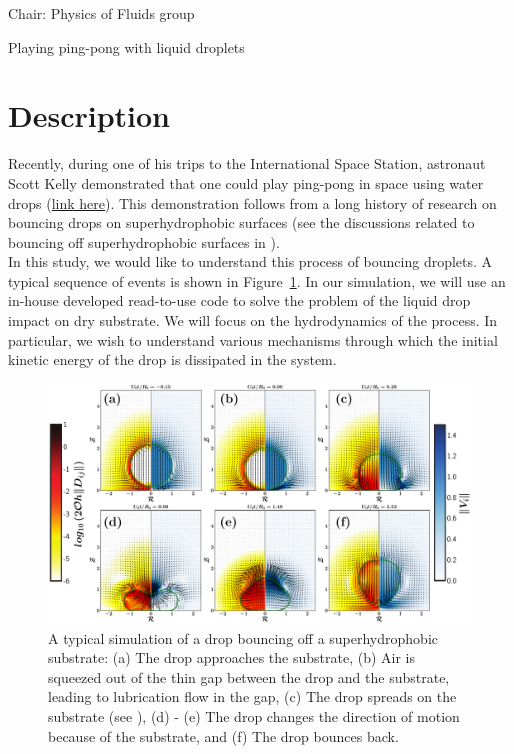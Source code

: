 \documentclass[a4paper,10pt]{article}
\begin{document}
\noindent Chair: Physics of Fluids group
\begin{center}
 \begin{LARGE}
  Playing ping-pong with liquid droplets
 \end{LARGE}
\end{center}
\section*{Description}
Recently, during one of his trips to the International Space Station, astronaut Scott Kelly demonstrated that one could play ping-pong in space using water drops (\href{https://www.youtube.com/watch?v=TLbhrMCM4_0}{link here}). This demonstration follows from a long history of research on bouncing drops on superhydrophobic surfaces (see the discussions related to bouncing off superhydrophobic surfaces in \citet{josserand2016drop}).\\
In this study, we would like to understand this process of bouncing droplets. A typical sequence of events is shown in Figure~\ref{Figure::Typical}. In our simulation, we will use an in-house developed read-to-use code to solve the problem of the liquid drop impact on dry substrate. We will focus on the hydrodynamics of the process. In particular, we wish to understand various mechanisms through which the initial kinetic energy of the drop is dissipated in the system.
\begin{figure}[H]
\begin{center}
 \includegraphics[width=\textwidth]{Figure1.pdf}
 \caption{A typical simulation of a drop bouncing off a superhydrophobic substrate: (a) The drop approaches the substrate, (b) Air is squeezed out of the thin gap between the drop and the substrate, leading to lubrication flow in the gap, (c) The drop spreads on the substrate (see \citet{wildeman2016spreading}), (d) - (e) The drop changes the direction of motion because of the substrate, and (f) The drop bounces back.}
 \label{Figure::Typical}
\end{center}
\end{figure}
\end{document}
